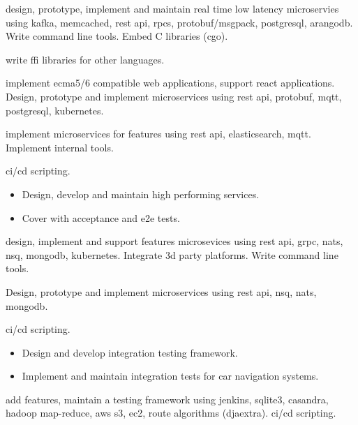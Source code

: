 \documentclass[10pt,a4paper,ragged2e,withhyper]{altacv}
\begin{document}

 design, prototype, implement and maintain real time low latency
microservies using kafka, memcached, rest api, rpcs, protobuf/msgpack,
postgresql, arangodb. Write command line tools. Embed C libraries (cgo).

 write ffi libraries for other languages.

 implement ecma5/6 compatible web applications, support react
applications. Design, prototype and implement microservices using rest api,
protobuf, mqtt, postgresql, kubernetes.

 implement microservices for features using rest api, elasticsearch,
mqtt. Implement internal tools.

 ci/cd scripting.

\divider

\begin{itemize}
\item Design, develop and maintain high performing services.
\item Cover with acceptance and e2e tests.
\end{itemize}


 design, implement and support features microsevices using rest
api, grpc, nats, nsq, mongodb, kubernetes. Integrate 3d party platforms. Write
command line tools.

 Design, prototype and implement microservices using rest api,
nsq, nats, mongodb.

 ci/cd scripting.

\divider

\begin{itemize}
\item Design and develop integration testing framework.
\item Implement and maintain integration tests for car navigation systems.
\end{itemize}


 add features, maintain a testing framework using jenkins,
sqlite3, casandra, hadoop map-reduce, aws s3, ec2, route algorithms (djaextra).
ci/cd scripting.
\end{document}
